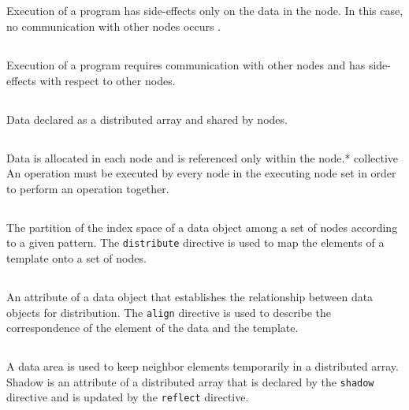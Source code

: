 \subsection*{}
Execution of a program has
side-effects only on the data in the node. In this case, no communication
with other nodes occurs . 

\subsection*{}
Execution of a program requires
communication with other nodes and has side-effects with respect to other
nodes. 

\subsection*{}
Data declared as a distributed array and shared by nodes.

\subsection*{}
Data is allocated in each node and is referenced only
within the node.* collective  An operation must be executed by every
node in the executing node set in order to perform an operation together.

\subsection*{}
The partition of the index space of a data
object among a set of nodes according to a given pattern. The
{\tt distribute} directive is used to map the elements of a template onto a set of nodes. 

\subsection*{}
An attribute of a data object that establishes
the relationship between data objects for distribution. The {\tt align}
directive is used to describe the correspondence of the element of the data and the template. 

\subsection*{}
A data area is used to keep neighbor elements
temporarily in a distributed array. Shadow is an attribute of
a distributed array that is declared by the {\tt shadow} directive and is updated by the {\tt reflect} directive.

